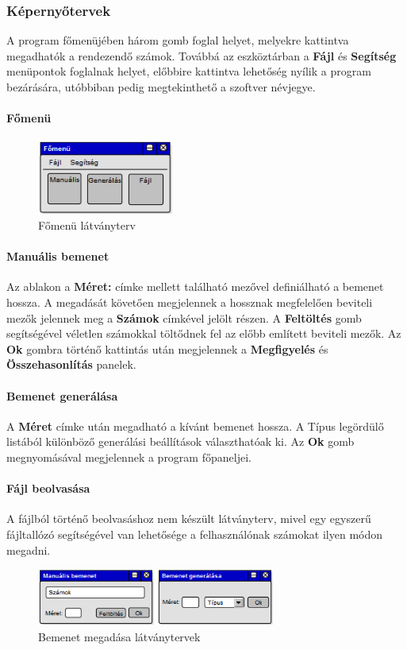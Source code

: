 \documentclass{elteikthesis}
\begin{document}
\subsubsection{Képernyőtervek}
A program főmenüjében három gomb foglal helyet, melyekre kattintva megadhatók a rendezendő számok. Továbbá az eszköztárban a \textbf{Fájl} és \textbf{Segítség} menüpontok foglalnak helyet, előbbire kattintva lehetőség nyílik a program bezárására, utóbbiban pedig megtekinthető a szoftver névjegye.
\paragraph{Főmenü}
\begin{figure}[H]
	\centering
	\includegraphics[width=0.4\textwidth]{pics/plan_mainmenu.png}
	\caption{Főmenü látványterv}
\end{figure}\par
\paragraph{Manuális bemenet}
Az ablakon a \textbf{Méret:} címke mellett található mezővel definiálható a bemenet hossza. A megadását követően megjelennek a hossznak megfelelően beviteli mezők jelennek meg a \textbf{Számok} címkével jelölt részen. A \textbf{Feltöltés} gomb segítségével véletlen számokkal töltődnek fel az előbb említett beviteli mezők. Az \textbf{Ok} gombra történő kattintás után megjelennek a \textbf{Megfigyelés} és \textbf{Összehasonlítás} panelek.
\paragraph{Bemenet generálása}
A \textbf{Méret} címke után megadható a kívánt bemenet hossza. A Típus legördülő listából különböző generálási beállítások választhatóak ki. Az \textbf{Ok} gomb megnyomásával megjelennek a program főpaneljei.
\paragraph{Fájl beolvasása}
A fájlból történő beolvasáshoz nem készült látványterv, mivel egy egyszerű fájltallózó segítségével van lehetősége a felhasználónak számokat ilyen módon megadni.
\begin{figure}[H]
	\centering
	\includegraphics[width=0.7\textwidth]{pics/plan_input.png}
	\caption{Bemenet megadása látványtervek}
\end{figure}\par
\end{document}
